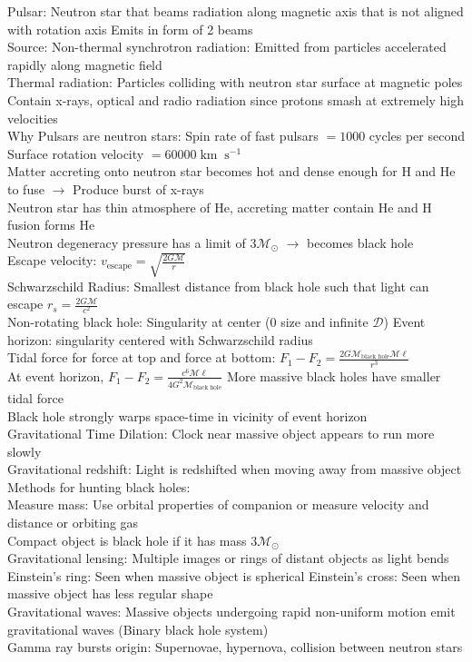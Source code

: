 \documentclass{article}
\DeclareMathOperator{\s}{s}
\DeclareMathOperator{\km}{km}
\begin{document}
Pulsar: Neutron star that beams radiation along magnetic axis that is not aligned with rotation axis \quad Emits in form of 2 beams\\
Source: Non-thermal synchrotron radiation: Emitted from particles accelerated rapidly along magnetic field\\
Thermal radiation: Particles colliding with neutron star surface at magnetic poles \\ 
Contain x-rays, optical and radio radiation since protons smash at extremely high velocities\\
Why Pulsars are neutron stars: Spin rate of fast pulsars $=1000$ cycles per second \quad Surface rotation velocity $=60000\km\s^{-1}$\\
Matter accreting onto neutron star becomes hot and dense enough for H and He to fuse $\rightarrow$ Produce burst of x-rays\\
Neutron star has thin atmosphere of He, accreting matter contain He and H fusion forms He\\
Neutron degeneracy pressure has a limit of $3\mathcal{M}_{\odot}$ $\rightarrow$ becomes black hole\\
Escape velocity: $v_{\text{escape}}=\sqrt{\frac{2G\mathcal{M}}{r}}$\\
Schwarzschild Radius: Smallest distance from black hole such that light can escape \quad $r_{s}=\frac{2G\mathcal{M}}{c^{2}}$\\
Non-rotating black hole: Singularity at center (0 size and infinite $\mathcal{D}$) \quad Event horizon: singularity centered with Schwarzschild radius\\
Tidal force for force at top and force at bottom: $F_{1}-F_{2}=\frac{2G\mathcal{M}_{\text{black hole}}\mathcal{M}\ell}{r^{3}}$\\
At event horizon, $F_{1}-F_{2}=\frac{c^{6}\mathcal{M}\ell}{4G^{2}\mathcal{M}_{\text{black hole}}}$ \quad More massive black holes have smaller tidal force\\
Black hole strongly warps space-time in vicinity of event horizon\\
Gravitational Time Dilation: Clock near massive object appears to run more slowly\\
Gravitational redshift: Light is redshifted when moving away from massive object\\
Methods for hunting black holes:\\
Measure mass: Use orbital properties of companion or measure velocity and distance or orbiting gas \\ 
Compact object is black hole if it has mass $3\mathcal{M}_{\odot}$\\
Gravitational lensing: Multiple images or rings of distant objects as light bends\\
Einstein's ring: Seen when massive object is spherical \quad Einstein's cross: Seen when massive object has less regular shape\\
Gravitational waves: Massive objects undergoing rapid non-uniform motion emit gravitational waves (Binary black hole system)\\
Gamma ray bursts origin: Supernovae, hypernova, collision between neutron stars
\end{document}
